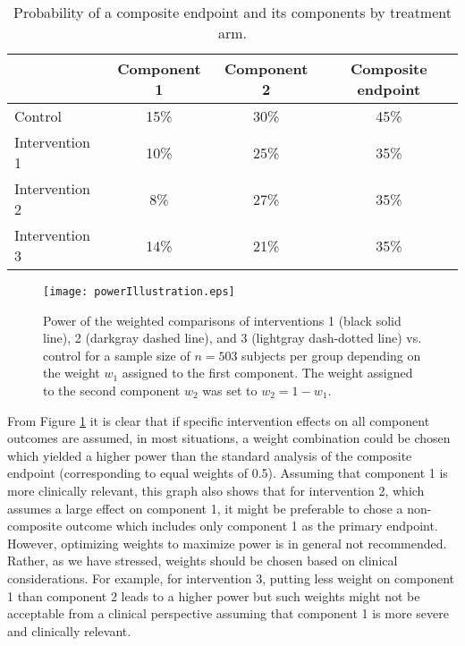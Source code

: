 \documentclass[times,doublespace]{simauth_amod}
\begin{document}
\begin{table}[h]
	\caption{Probability of a composite endpoint and its components by treatment arm.\label{tab:power_ill}}
	{\tabcolsep=4.25pt
		\begin{centering}
			\begin{tabular}{lccc}
				\toprule 
				&
				Component 1 &
				Component 2 &
				Composite endpoint\tabularnewline
				\midrule
				Control &
				15\% &
				30\% &
				45\%\tabularnewline
				Intervention 1 &
				10\% &
				25\% &
				35\%\tabularnewline
				Intervention 2 &
				8\% &
				27\% &
				35\%\tabularnewline
				Intervention 3 &
				14\% &
				21\% &
				35\%\tabularnewline
				\bottomrule
			\end{tabular}
			\par\end{centering}}
\end{table}

\begin{figure}[h]
	\centering{}\texttt{[image: powerIllustration.eps]}\\
	\caption{Power of the weighted comparisons of interventions 1 (black solid line), 2 (darkgray dashed line), and 3 (lightgray dash-dotted line) vs. control for a sample size of $n=503$ subjects per group depending on the weight $w_{1}$ assigned to the first component. The weight assigned to the second component $w_{2}$ was set to $w_{2}=1-w_{1}$. \label{fig:power_ill} }
\end{figure}


From Figure \ref{fig:power_ill} it is clear that if specific intervention effects on all component outcomes are assumed, in most situations, a weight combination could be chosen which yielded a higher power than the standard analysis of the composite endpoint (corresponding to equal weights of 0.5). Assuming that component 1 is more clinically relevant, this graph also shows that for intervention 2, which assumes a large effect on component 1, it might be preferable to chose a non-composite outcome which includes only component 1 as the primary endpoint. However, optimizing weights to maximize power is in general not recommended. Rather, as we have stressed, weights should be chosen based on clinical considerations. For example, for intervention 3, putting less weight on component 1 than component 2 leads to a higher power but such weights might not be acceptable from a clinical perspective assuming that component 1 is more severe and clinically relevant. 
\end{document}

